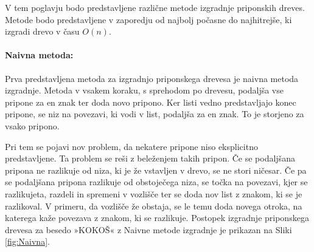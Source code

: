 V tem poglavju bodo predstavljene različne metode izgradnje priponskih dreves. Metode bodo predstavljene v zaporedju od najbolj počasne do najhitrejše, ki izgradi drevo v času $O(n)$. 

\paragraph{Naivna metoda:}
Prva predstavljena metoda za izgradnjo priponskega drevesa je naivna metoda izgradnje. Metoda v vsakem koraku, s sprehodom po drevesu, podaljša vse pripone za en znak ter doda novo pripono. Ker listi vedno predstavljajo konec pripone, se niz na povezavi, ki vodi v list, podaljša za en znak. To je storjeno za vsako pripono.

Pri tem se pojavi nov problem, da nekatere pripone niso eksplicitno predstavljene. Ta problem se reši z beleženjem takih pripon. Če se podaljšana pripona ne razlikuje od niza, ki je že vstavljen v drevo, se ne stori ničesar. Če pa se podaljšana pripona razlikuje od obstoječega niza, se točka na povezavi, kjer se razlikujeta, razdeli in spremeni v vozlišče ter se doda nov list z znakom, ki se je razlikoval. V primeru, da vozlišče že obstaja, se le temu doda novega otroka, na katerega kaže povezava z znakom, ki se razlikuje. Postopek izgradnje priponskega drevesa za besedo »KOKOŠ« z Naivne metode izgradnje je prikazan na Sliki \ref{fig:Naivna}.

